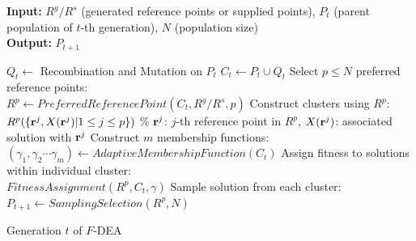 \documentclass[review]{elsarticle}
\begin{document}

\begin{algorithm}[!h]
	
	\textbf{Input:} $R^g/R^s$ (generated reference points or supplied points), $P_t$ (parent population of $t$-th generation), $N$ (population size)\\
	\textbf{Output:} $P_{t+1}$
	
	\begin{algorithmic}[1]
		\STATE $Q_t \gets $ Recombination and Mutation on $P_t$
		\STATE $C_t \gets P_t \cup Q_t$				
		\STATE Select $p\le N$ preferred reference points:\\ $R^p \gets PreferredReferencePoint(C_t, R^g/R^s, p)$	
		\STATE Construct clusters using $R^p$:\\ $R^p(\{{\bf r}^j,X({\bf r}^j)|1\le j\le p\})$ \% ${\bf r}^j$: $j$-th reference point in $R^p$, $X({\bf r}^j)$: associated solution with ${\bf r}^j$
		\STATE Construct $m$ membership functions:\\$(\gamma_1,\gamma_2\cdots\gamma_m) \gets AdaptiveMembershipFunction(C_t)$		
		\STATE Assign fitness to solutions within individual cluster:\\ $FitnessAssignment(R^p,C_t,\gamma)$
		\STATE Sample solution from each cluster:\\ $P_{t+1}\gets SamplingSelection(R^p,N)$
		
	\end{algorithmic} 
	
	\caption{Generation $t$ of $F$-DEA}
	
	\label{alg:completeAlgorithm}
\end{algorithm}

\end{document}
